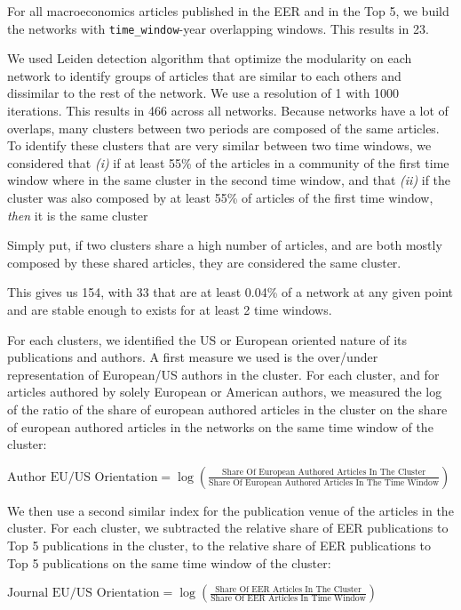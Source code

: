 \documentclass[]{elsarticle} %
\begin{document}
For all macroeconomics articles published in the EER and in the Top 5,
we build the networks with \texttt{time\_window}-year overlapping
windows. This results in 23.

We used Leiden detection algorithm \citep{traag2019} that optimize the
modularity on each network to identify groups of articles that are
similar to each others and dissimilar to the rest of the network. We use
a resolution of 1 with 1000 iterations. This results in 466 across all
networks. Because networks have a lot of overlaps, many clusters between
two periods are composed of the same articles. To identify these
clusters that are very similar between two time windows, we considered
that \emph{(i)} if at least 55\% of the articles in a community of the
first time window where in the same cluster in the second time window,
and that \emph{(ii)} if the cluster was also composed by at least 55\%
of articles of the first time window, \emph{then} it is the same cluster

Simply put, if two clusters share a high number of articles, and are
both mostly composed by these shared articles, they are considered the
same cluster.

This gives us 154, with 33 that are at least 0.04\% of a network at any
given point and are stable enough to exists for at least 2 time windows.

For each clusters, we identified the US or European oriented nature of
its publications and authors. A first measure we used is the over/under
representation of European/US authors in the cluster. For each cluster,
and for articles authored by solely European or American authors, we
measured the log of the ratio of the share of european authored articles
in the cluster on the share of european authored articles in the
networks on the same time window of the cluster:

\({\scriptstyle \text{Author EU/US Orientation}=\log(\frac{\text{Share Of European Authored Articles In The Cluster}}{\text{Share Of European Authored Articles In The Time Window}})}\)

We then use a second similar index for the publication venue of the
articles in the cluster. For each cluster, we subtracted the relative
share of EER publications to Top 5 publications in the cluster, to the
relative share of EER publications to Top 5 publications on the same
time window of the cluster:

\({\scriptstyle \text{Journal EU/US Orientation}=\log(\frac{\text{Share Of EER Articles In The Cluster}}{\text{Share Of EER  Articles In Time Window}})}\)
\end{document}
